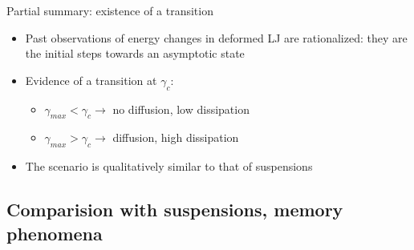 \documentclass[compress]{beamer}
\begin{document}
	\begin{frame}{Partial summary: existence of a transition}
		
		\begin{itemize}
			\item<1-> Past observations of energy changes in deformed LJ are rationalized: they are the initial steps towards an asymptotic state
			\item<2-> Evidence of a transition at $\gamma_{c}$:
				\begin{itemize}
					\item<3-> $\gamma_{max} < \gamma_{c} \rightarrow$ no diffusion, low dissipation
					\item<4-> $\gamma_{max} > \gamma_{c} \rightarrow$ diffusion, high dissipation
				\end{itemize}
			\item<5-> The scenario is qualitatively similar to that of suspensions
		\end{itemize}
		
	\end{frame}

	\subsection{Comparision with suspensions, memory phenomena}
\end{document}
